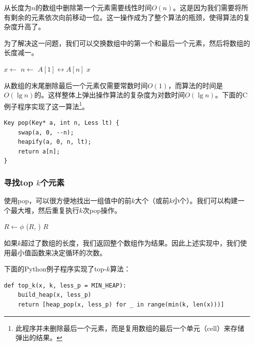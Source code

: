 \documentclass[b5paper]{ctexart}
\begin{document}
从长度为$n$的数组中删除第一个元素需要线性时间$O(n)$。这是因为我们需要将所有剩余的元素依次向前移动一位。这一操作成为了整个算法的瓶颈，使得算法的复杂度升高了。

为了解决这一问题，我们可以交换数组中的第一个和最后一个元素，然后将数组的长度减一。

\begin{algorithmic}[1]
  \State $x \gets$ 
  \State $n \gets$ 
  \State {} $A[1] \leftrightarrow A[n]$
  \State {}
    \State {}
  \EndIf
  \State \Return $x$
\EndFunction
\end{algorithmic}

从数组的末尾删除最后一个元素仅需要常数时间$O(1)$，而算法的时间是$O(\lg n)$的。这样整体上弹出操作算法的复杂度为对数时间$O(\lg n)$。下面的C例子程序实现了这一算法\footnote{此程序并未删除最后一个元素，而是复用数组的最后一个单元（cell）来存储弹出的结果。}。

\lstset{language=C}
\begin{lstlisting}
Key pop(Key* a, int n, Less lt) {
    swap(a, 0, --n);
    heapify(a, 0, n, lt);
    return a[n];
}
\end{lstlisting}

\subsubsection{寻找top $k$个元素}

使用pop，可以很方便地找出一组值中的前$k$大个（或前$k$小个）。我们可以构建一个最大堆，然后重复执行$k$次pop操作。

\begin{algorithmic}[1]
  \State $R \gets \phi$
  \State {}
    \State {}($R$, )
  \EndFor
  \State \Return $R$
\EndFunction
\end{algorithmic}

如果$k$超过了数组的长度，我们返回整个数组作为结果。因此上述实现中，我们使用最小值函数来决定循环的次数。

下面的Python例子程序实现了top-$k$算法：

\lstset{language=Python}
\begin{lstlisting}
def top_k(x, k, less_p = MIN_HEAP):
    build_heap(x, less_p)
    return [heap_pop(x, less_p) for _ in range(min(k, len(x)))]
\end{lstlisting}
\end{document}
